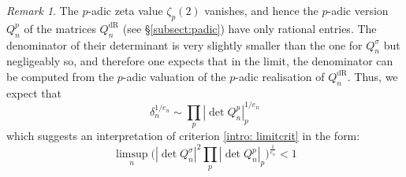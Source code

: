 \documentclass[a4paper,10pt]{amsart}
\theoremstyle{definition}
\theoremstyle{remark}
\newtheorem{rem}[thm]{Remark}
\numberwithin{equation}{section}
\newcommand{\dR}{\mathrm{dR}}
\newcommand{\0}{\color{blue}{\mathsf{0}}}
\begin{document}
\begin{rem} \label{rem: zeta2padic} 
The $p$-adic zeta value $\zeta_p(2)$ vanishes, and hence the $p$-adic version  $Q^{p}_n$  of the matrices $Q^{\dR}_n$  (see  \S\ref{subsect:padic}) have only rational entries. The denominator of their determinant is very slightly smaller than the one for $Q^{\sigma}_n$ but negligeably so, and therefore one expects that in the limit, the denominator can be computed from the $p$-adic valuation of the $p$-adic realisation of $Q^{\dR}_n$.
Thus, we  expect that 
\[  \delta_n^{1/e_n} \sim  \prod_p \left| \det Q^p_n \right|^{1/e_n}_p 
\]
which suggests an interpretation of criterion \ref{intro: limitcrit} in  the form: 
\begin{equation} \limsup_n   \Big( \left| \det Q_n^{\sigma} \right|^2  \prod_p   \left| \det Q^p_n \right|_p\Big)^{\frac{1}{e_n}}  <1\end{equation} 

\end{rem}
%





%
%
\end{document}
